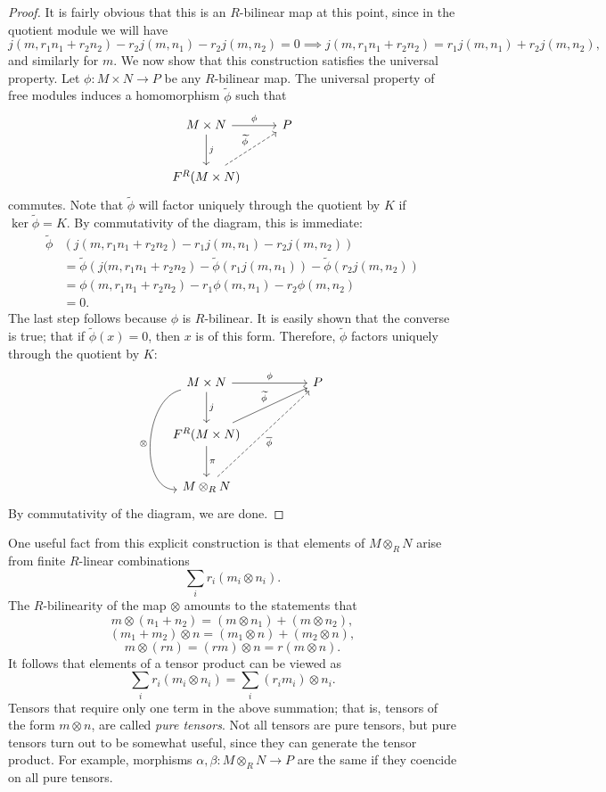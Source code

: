 \begin{proof}
	It is fairly obvious that this is an $R$-bilinear map at this point, since in the quotient module we will have
	\[
		j(m,r_1n_1+r_2n_2)-r_2j(m,n_1)-r_2j(m,n_2)=0\implies j(m,r_1n_1+r_2n_2)=r_1j(m,n_1)+r_2j(m,n_2)
	,\]
	and similarly for $m$. We now show that this construction satisfies the universal property. Let $\phi : M\times N \to P$ be any $R$-bilinear map. The universal property of free modules induces a homomorphism $\widetilde{\phi } $ such that
	\[\begin{tikzcd}[row sep = 2.5em, column sep = 2.5em]
		M\times N\arrow[d,"j"]\arrow[r, "\phi "]&P\\
		F^R(M\times N)\arrow[ru, dashed, "\widetilde{\phi }"]
	\end{tikzcd}\]
	commutes. Note that $\widetilde{\phi } $ will factor uniquely through the quotient by $K$ if $\ker \widetilde{\phi } =K$. By commutativity of the diagram, this is immediate:
	\begin{align*}
		\widetilde{\phi } &\left( j(m,r_1n_1+r_2n_2)-r_1j(m,n_1)-r_2j(m,n_2) \right) \\
				  &=\widetilde{\phi } \left( j(m,r_1n_1+r_2n_2 \right) -\widetilde{\phi } \left( r_1j(m,n_1) \right) -\widetilde{\phi } \left( r_2j(m,n_2) \right) \\
				  &=\phi (m,r_1n_1+r_2n_2)-r_1\phi (m,n_1)-r_2\phi (m,n_2)\\
				  &=0
	.\end{align*}
	The last step follows because $\phi $ is $R$-bilinear. It is easily shown that the converse is true; that if $\widetilde{\phi } (x)=0$, then $x$ is of this form. Therefore, $\widetilde{\phi } $ factors uniquely through the quotient by $K$:
	\[\begin{tikzcd}[row sep = 2.5em, column sep = 5em]
		M\times N\arrow[dd, bend right, in=-85, out=-75, "\otimes "']\arrow[d, "j"]\arrow[r, "\phi "]&P\\
		F^R(M\times N)\arrow[ru, "\widetilde{\phi }"]\arrow[d, "\pi "]\\
		M\otimes_R N\arrow[ruu, dashed, " \overline{\phi } "']
	\end{tikzcd}\]
	By commutativity of the diagram, we are done.
\end{proof}

One useful fact from this explicit construction is that elements of $M\otimes_R N$ arise from finite $R$-linear combinations
\[
	\sum_{i} r_i\left( m_i \otimes n_i \right) 
.\]
The $R$-bilinearity of the map $\otimes $ amounts to the statements that
\[
	m\otimes (n_1+n_2)=(m\otimes n_1)+(m\otimes n_2),
\]
\[
	(m_1+m_2)\otimes n=(m_1\otimes n)+(m_2\otimes n),
\]
\[
	m\otimes (rn)=(r m)\otimes n=r(m\otimes n)
.\]
It follows that elements of a tensor product can be viewed as
\[
	\sum_{i} r_i\left( m_i\otimes n_i \right) =\sum_{i} (r_im_i)\otimes n_i
.\]
Tensors that require only one term in the above summation; that is, tensors of the form $m\otimes n$, are called \emph{pure tensors}. Not all tensors are pure tensors, but pure tensors turn out to be somewhat useful, since they can generate the tensor product. For example, morphisms $\alpha ,\beta : M\otimes_R N \to P$ are the same if they coencide on all pure tensors.

